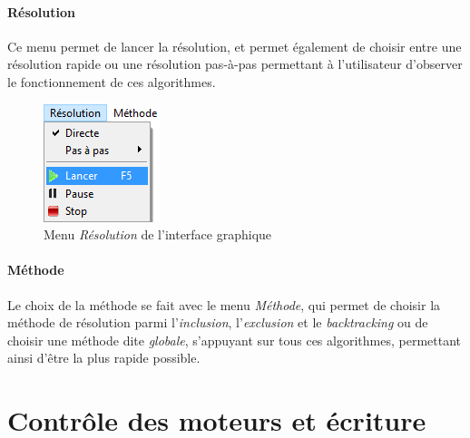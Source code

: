 \documentclass[12pt,a4paper]{report}
\begin{document}
\paragraph{Résolution}Ce menu permet de lancer la résolution, et permet également de choisir entre une résolution rapide ou une résolution pas-à-pas permettant à l'utilisateur d'observer le fonctionnement de ces algorithmes.

\begin{figure}[!h]
 \center
 \includegraphics[scale=1.2]{../pictures/menu_resolution}
 \caption{Menu \emph{Résolution} de l'interface graphique}
\end{figure}

\paragraph{Méthode}Le choix de la méthode se fait avec le menu \emph{Méthode}, qui permet de choisir la méthode de résolution parmi l'\emph{inclusion}, l'\emph{exclusion} et le \emph{backtracking} ou de choisir une méthode dite \emph{globale}, s'appuyant sur tous ces algorithmes, permettant ainsi d'être la plus rapide possible.

\section{Contrôle des moteurs et écriture}
\end{document}
